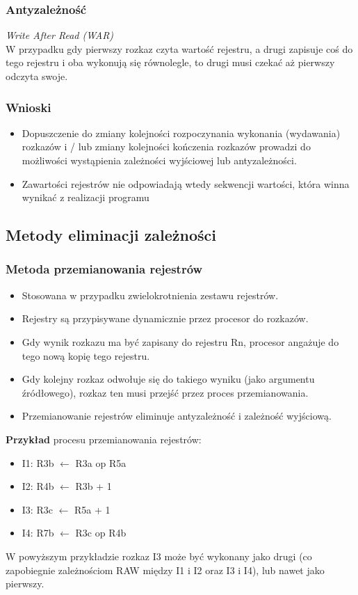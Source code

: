 		\subsubsection{Antyzależność}
	         \emph{Write After Read (WAR)}\\
	         W przypadku gdy pierwszy rozkaz czyta wartość rejestru, a drugi zapisuje coś do tego rejestru i oba wykonują się równolegle, to drugi musi czekać aż pierwszy odczyta swoje.
        \subsubsection{Wnioski}
	        \begin{itemize}
	           	\item Dopuszczenie do zmiany kolejności rozpoczynania wykonania (wydawania) rozkazów i / lub zmiany kolejności kończenia rozkazów prowadzi do możliwości wystąpienia zależności wyjściowej lub antyzależności.
	           	\item Zawartości rejestrów nie odpowiadają wtedy sekwencji wartości, która winna wynikać z realizacji programu
	        \end{itemize}
        
	\subsection{Metody eliminacji zależności}
		\subsubsection{Metoda przemianowania rejestrów}
			\begin{itemize}
				\item Stosowana w przypadku zwielokrotnienia zestawu rejestrów.
				\item Rejestry są przypisywane dynamicznie przez procesor do rozkazów.
				\item Gdy wynik rozkazu ma być zapisany do rejestru Rn, procesor angażuje do tego nową kopię tego rejestru.
				\item Gdy kolejny rozkaz odwołuje się do takiego wyniku (jako argumentu źródłowego), rozkaz ten musi przejść przez proces przemianowania.
				\item Przemianowanie rejestrów eliminuje antyzależność i zależność wyjściową.
			\end{itemize}
			\textbf{Przykład} procesu przemianowania rejestrów:
			\begin{itemize}
				\item I1: R3b $ \leftarrow $ R3a op R5a
				\item I2: R4b $ \leftarrow $ R3b + 1
				\item I3: R3c $ \leftarrow $ R5a + 1
				\item I4: R7b $ \leftarrow $ R3c op R4b
			\end{itemize}
			W powyższym przykładzie rozkaz I3 może być wykonany jako drugi (co zapobiegnie zależnościom RAW między I1 i I2 oraz I3 i I4), lub nawet jako pierwszy.
			
